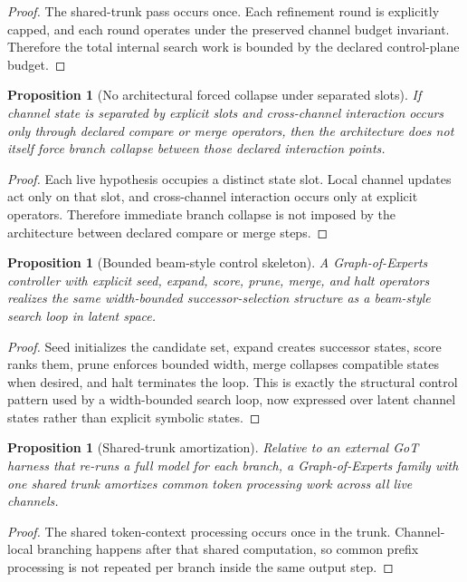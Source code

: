 \documentclass[11pt]{article}
\newtheorem{proposition}[definition]{Proposition}
\begin{document}
\begin{proof}
The shared-trunk pass occurs once. Each refinement round is explicitly capped,
and each round operates under the preserved channel budget invariant. Therefore
the total internal search work is bounded by the declared control-plane budget.
\end{proof}

\begin{proposition}[No architectural forced collapse under separated slots]
If channel state is separated by explicit slots and cross-channel interaction
occurs only through declared compare or merge operators, then the architecture
does not itself force branch collapse between those declared interaction points.
\end{proposition}

\begin{proof}
Each live hypothesis occupies a distinct state slot. Local channel updates act
only on that slot, and cross-channel interaction occurs only at explicit
operators. Therefore immediate branch collapse is not imposed by the
architecture between declared compare or merge steps.
\end{proof}

\begin{proposition}[Bounded beam-style control skeleton]
A Graph-of-Experts controller with explicit seed, expand, score, prune, merge,
and halt operators realizes the same width-bounded successor-selection
structure as a beam-style search loop in latent space.
\end{proposition}

\begin{proof}
Seed initializes the candidate set, expand creates successor states, score
ranks them, prune enforces bounded width, merge collapses compatible states when
desired, and halt terminates the loop. This is exactly the structural control
pattern used by a width-bounded search loop, now expressed over latent channel
states rather than explicit symbolic states.
\end{proof}

\begin{proposition}[Shared-trunk amortization]
Relative to an external GoT harness that re-runs a full model for each branch,
a Graph-of-Experts family with one shared trunk amortizes common token
processing work across all live channels.
\end{proposition}

\begin{proof}
The shared token-context processing occurs once in the trunk. Channel-local
branching happens after that shared computation, so common prefix processing is
not repeated per branch inside the same output step.
\end{proof}
\end{document}
